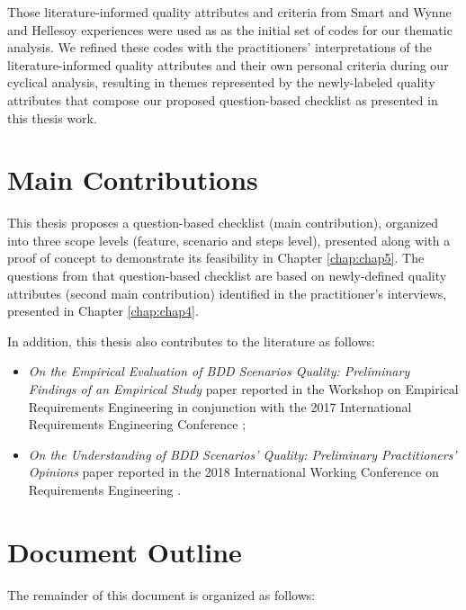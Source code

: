 Those literature-informed quality attributes and criteria from Smart \cite{Smart_2014} and Wynne and Hellesoy \cite{Wynne_and_Hellesoy_2012} experiences were used as as the initial set of codes for our thematic analysis. We refined these codes with the practitioners' interpretations of the literature-informed quality attributes and their own personal criteria during our cyclical analysis, resulting in themes represented by the newly-labeled quality attributes that compose our proposed question-based checklist as presented in this thesis work. 

\section{Main Contributions}

This thesis proposes a question-based checklist (main contribution), organized into three scope levels (feature, scenario and steps level), presented along with a proof of concept to demonstrate its feasibility in Chapter \ref{chap:chap5}. The questions from that question-based checklist are based on newly-defined quality attributes (second main contribution) identified in the practitioner's interviews, presented in Chapter \ref{chap:chap4}.

In addition, this thesis also contributes to the literature as follows: 

\begin{itemize}
    \item \textit{On the Empirical Evaluation of BDD Scenarios Quality: Preliminary Findings of an Empirical Study} paper reported in the Workshop on Empirical Requirements Engineering in conjunction with the 2017 International Requirements Engineering Conference \cite{Empire_2017};
    \item \textit{On the Understanding of BDD Scenarios' Quality: Preliminary Practitioners' Opinions} paper reported in the 2018 International Working Conference on Requirements Engineering \cite{Refsq_2018}. 
\end{itemize}

\section{Document Outline}

The remainder of this document is organized as follows:

